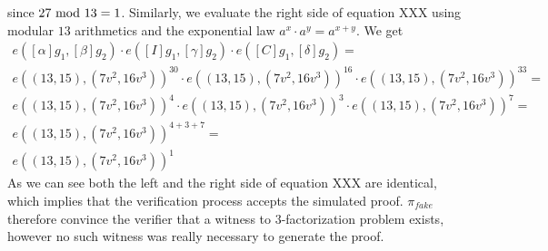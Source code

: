 \begin{example}
$$$$
since $27 \text{ mod } 13=1$. Similarly, we evaluate the right side of equation XXX using modular $13$ arithmetics and the exponential law $a^x\cdot a^y = a^{x+y}$. We get
\begin{align*}
e([\alpha]g_1,[\beta]g_2)\cdot e([I]g_1,[\gamma]g_2)\cdot e([C]g_1,[\delta]g_2) =\\
e((13,15),(7v^2,16v^3))^{30}\cdot e((13,15),(7v^2,16v^3))^{16}\cdot e((13,15),(7v^2,16v^3))^{33} =\\
e((13,15),(7v^2,16v^3))^{4}\cdot e((13,15),(7v^2,16v^3))^{3}\cdot e((13,15),(7v^2,16v^3))^{7} =\\
e((13,15),(7v^2,16v^3))^{4+3+7} = \\
e((13,15),(7v^2,16v^3))^{1}
\end{align*}
As we can see both the left and the right side of equation XXX are identical, which implies that the verification process accepts the simulated proof. $\pi_{fake}$ therefore convince the verifier that a witness to $3$-factorization problem exists, however no such witness was really necessary to generate the proof.
\end{example}










